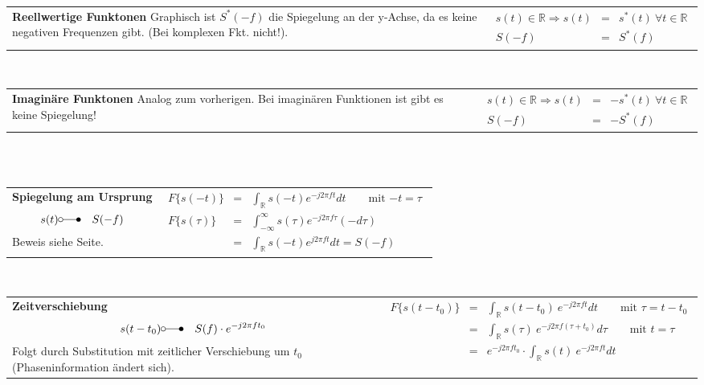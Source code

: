 \vspace{6pt}
\begin{tabular}{ll}
 \addtolength{\jot}{2mm}
 \parbox{7cm}{
  \centering
\textbf{Reellwertige Funktonen}
\flushleft
Graphisch ist $S^*(-f)$ die Spiegelung an der y-Achse, da es keine negativen Frequenzen gibt. (Bei komplexen Fkt. nicht!).
}
 &
 \parbox{5cm}{
 \begin{eqnarray*}
s(t) \in \mathbb{R} \Rightarrow s(t) &=& s^*(t) ~ \forall t \in \mathbb{R}\\
S(-f) &=& S^*(f)
 \end{eqnarray*}
}
\end{tabular}\\
\vspace{6pt}
\begin{tabular}{ll}
 \addtolength{\jot}{2mm}
 \parbox{7cm}{
  \centering
\textbf{Imaginäre Funktonen}
\flushleft
Analog zum vorherigen. Bei imaginären Funktionen ist gibt es keine Spiegelung!
}
 &
 \parbox{5cm}{
 \begin{eqnarray*}
s(t) \in \mathbb{R} \Rightarrow s(t) &=& -s^*(t) ~ \forall t \in \mathbb{R}\\
S(-f) &=& -S^*(f)
 \end{eqnarray*}
}
\end{tabular}\\~
\vfill\columnbreak
\begin{tabular}{ll}
 \addtolength{\jot}{2mm}
 \parbox{6cm}{
  \centering
\textbf{Spiegelung am Ursprung}
\begin{eqnarray*}
s(t) &\laplace& S(-f)
\end{eqnarray*}
Beweis siehe Seite.
}
 &
 \parbox{5cm}{
 \begin{eqnarray*}
 F \lbrace s(-t)\rbrace &=& \int_\mathbb{R} s(-t) e^{-j2 \pi ft} dt \qquad \text{mit $-t = \tau$}\\
F \lbrace s(\tau)\rbrace&=& \int_{-\infty}^\infty s(\tau) e^{-j2 \pi f \tau} (-d\tau)\\
&=& \int_\mathbb{R} s(-t) e^{j2 \pi ft} dt = S(-f)
 \end{eqnarray*}
}
\end{tabular}\\
\vspace{6pt}
\begin{tabular}{ll}
 \addtolength{\jot}{2mm}
 \parbox{5cm}{
  \centering
\textbf{Zeitverschiebung}
\begin{eqnarray*}
s(t-t_0) &\laplace& S(f) \cdot e^{-j2 \pi f t_0}
\end{eqnarray*}
Folgt durch Substitution mit zeitlicher Verschiebung um $t_0$ \\(Phaseninformation ändert sich).
}
 &
 \parbox{5cm}{
 \begin{eqnarray*}
 F \lbrace s(t-t_0)\rbrace &=& \int_\mathbb{R} s(t-t_0) ~e^{-j2 \pi ft} dt \qquad \text{mit $\tau = t-t_0$}\\
&=& \int_\mathbb{R} s(\tau) ~e^{-j2 \pi f (\tau + t_0)} d\tau \qquad \text{mit $t = \tau$}\\
&=&  e^{-j2 \pi f t_0} \cdot \int_\mathbb{R} s(t) ~e^{-j2 \pi ft} dt
 \end{eqnarray*}
}
\end{tabular}\\
